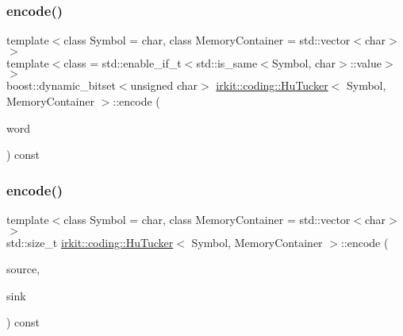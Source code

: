 \mbox{\label{classirkit_1_1coding_1_1HuTucker_aebcf6aaac07270505616093d3a0d745c}} 
\subsubsection{\texorpdfstring{encode()}{encode()}\hspace{0.1cm}{\footnotesize\ttfamily [2/3]}}
{\footnotesize\ttfamily template$<$class Symbol  = char, class Memory\+Container  = std\+::vector$<$char$>$$>$ \\
template$<$class  = std\+::enable\+\_\+if\+\_\+t$<$std\+::is\+\_\+same$<$\+Symbol, char$>$\+::value$>$$>$ \\
boost\+::dynamic\+\_\+bitset$<$unsigned char$>$ \mbox{\hyperlink{classirkit_1_1coding_1_1HuTucker}{irkit\+::coding\+::\+Hu\+Tucker}}$<$ Symbol, Memory\+Container $>$\+::encode (\begin{DoxyParamCaption}\item[{const std\+::string \&}]{word }\end{DoxyParamCaption}) const\hspace{0.3cm}{\ttfamily [inline]}}

\mbox{\label{classirkit_1_1coding_1_1HuTucker_a11a91f141460bec521b307b50ab89ebe}} 
\subsubsection{\texorpdfstring{encode()}{encode()}\hspace{0.1cm}{\footnotesize\ttfamily [3/3]}}
{\footnotesize\ttfamily template$<$class Symbol  = char, class Memory\+Container  = std\+::vector$<$char$>$$>$ \\
std\+::size\+\_\+t \mbox{\hyperlink{classirkit_1_1coding_1_1HuTucker}{irkit\+::coding\+::\+Hu\+Tucker}}$<$ Symbol, Memory\+Container $>$\+::encode (\begin{DoxyParamCaption}\item[{std\+::istream \&}]{source,  }\item[{\mbox{\hyperlink{classirkit_1_1io_1_1OutputBitStream}{io\+::\+Output\+Bit\+Stream}} \&}]{sink }\end{DoxyParamCaption}) const\hspace{0.3cm}{\ttfamily [inline]}}

